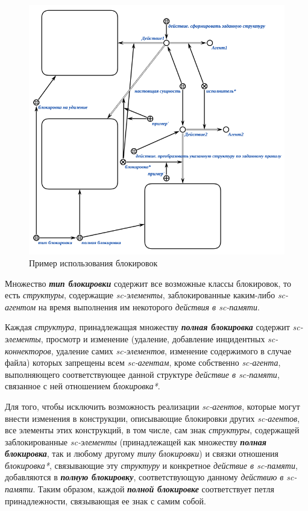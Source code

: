\begin{figure}[h]
	\centering
	\includegraphics[scale=0.8]{images/part3/chapter_situation_management/lock.png}
	\caption{Пример использования блокировок}
	\label{fig:lock}
\end{figure}

Множество \textbf{\textit{тип блокировки}} содержит все возможные классы блокировок, то есть \textit{структуры}, содержащие \textit{sc-элементы}, заблокированные каким-либо \textit{sc-агентом} на время выполнения им некоторого \textit{действия в sc-памяти}.

Каждая \textit{структура}, принадлежащая множеству \textbf{\textit{полная блокировка}} содержит \textit{sc-элементы}, просмотр и изменение (удаление, добавление инцидентных \textit{sc-коннекторов}, удаление самих \textit{sc-элементов}, изменение содержимого в случае файла) которых запрещены всем \textit{sc-агентам}, кроме собственно \textit{sc-агента}, выполняющего соответствующее данной структуре \textit{действие в sc-памяти}, связанное с ней отношением \textit{блокировка*}.
	
Для того, чтобы исключить возможность реализации \textit{sc-агентов}, которые могут внести изменения в конструкции, описывающие блокировки других \textit{sc-агентов}, все элементы этих конструкций, в том числе, сам знак \textit{структуры}, содержащей заблокированные \textit{sc-элементы} (принадлежащей как множеству \textbf{\textit{полная блокировка}}, так и любому другому \textit{типу блокировки}) и связки отношения \textit{блокировка*}, связывающие эту \textit{структуру} и конкретное \textit{действие в sc-памяти}, добавляются в \textbf{\textit{полную блокировку}}, соответствующую данному \textit{действию в sc-памяти}. Таким образом, каждой \textbf{\textit{полной блокировке}} соответствует петля принадлежности, связывающая ее знак с самим собой.


